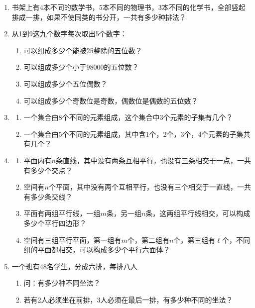 \begin{enumerate}
\item 书架上有4本不同的数学书，5本不同的物理书，3本不同的化学书，全部竖起排成一排，如果不使同类的书分开，一共有多少种排法？
\item 从1到9这九个数字每次取出5个数字：
\begin{enumerate}[(1)]
\item 可以组成多少个能被25整除的五位数？
\item 可以组成多少个小于98000的五位数？
\item 可以组成多少个五位偶数？
\item 可以组成多少个奇数位是奇数，偶数位是偶数的五位数？   
\end{enumerate}

\item \begin{enumerate}[(1)]
    \item 一个集合由8个不同的元素组成，这个集合中3个元素的子集有几个？
    \item 一个集合由5个不同的元素组成，其中含1个，2个，3个，4个元素的子集共有几个？
\end{enumerate}

\item \begin{enumerate}[(1)]
\item 平面内有$n$条直线，其中没有两条互相平行，也没有三条相交于一点，一共有多少个交点？
\item 空间有$n$个平面，其中没有两个互相平行，也没有三个相交于一直线，一共有多少条交线？
\item 平面有两组平行线，一组$m$条，另一组$n$条，这两组平行线相交，可以构成多少个平行四边形？
\item 空间有三组平行平面，第一组有$m$个，第二组有$n$个，第三组有$\ell$个，不同组的平面都相交，可以构成多少个平行六面体？
\end{enumerate}

\item 一个班有48名学生，分成六排，每排八人
\begin{enumerate}[(1)]
\item 问：有多少种不同坐法？
\item 若有2人必须坐在前排，3人必须在最后一排，有多少种不同的坐法？
\end{enumerate}


\end{enumerate}
